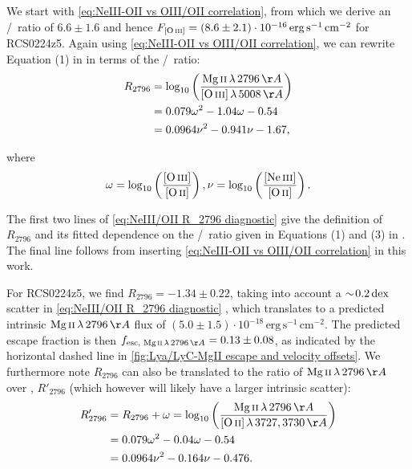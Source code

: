 We start with \cref{eq:NeIII-OII vs OIII/OII correlation}, from which we derive an \OIIIf/\OII\ ratio of $6.6 \pm 1.6$ and hence $F_\OIIIf = (8.6 \pm 2.1) \cdot 10^{-16} \, \mathrm{erg \, s^{-1} \, cm^{-2}}$ for RCS0224z5. Again using \cref{eq:NeIII-OII vs OIII/OII correlation}, we can rewrite Equation (1) in \citet{2018ApJ...855...96H} in terms of the \NeIII/\OII\ ratio:
\begin{align}
    \label{eq:NeIII/OII R_2796 diagnostic}
    R_{2796} & = \log_{10} \left( \frac{\MgII \, \lambda \, 2796 \, \Angstrom}{\OIIIf \, \lambda \, 5008 \, \Angstrom} \right) \nonumber
    \\
    & = 0.079 \omega^2 - 1.04 \omega - 0.54 \nonumber
    \\
    & = 0.0964 \nu^2 - 0.941 \nu - 1.67,
\end{align}

\noindent where
\begin{equation*}
    \omega = \log_{10} \left( \frac{\OIIIf}{\OII} \right), \nu = \log_{10} \left( \frac{\NeIII}{\OII} \right).
\end{equation*}

\noindent The first two lines of \cref{eq:NeIII/OII R_2796 diagnostic} give the definition of $R_{2796}$ and its fitted dependence on the \OIIIf/\OII\ ratio given in Equations (1) and (3) in \citet{2018ApJ...855...96H}. The final line follows from inserting \cref{eq:NeIII-OII vs OIII/OII correlation} in this work.

For RCS0224z5, we find $R_{2796} = -1.34 \pm 0.22$, taking into account a $\sim \! 0.2 \, \mathrm{dex}$ scatter in \cref{eq:NeIII/OII R_2796 diagnostic} \citep[see][]{2018ApJ...855...96H}, which translates to a predicted intrinsic $\MgII \, \lambda \, 2796 \, \Angstrom$ flux of $(5.0 \pm 1.5) \cdot 10^{-18} \, \mathrm{erg \, s^{-1} \, cm^{-2}}$. The predicted escape fraction is then $f_{\text{esc, }\MgII \, \lambda \, 2796 \, \Angstrom} = 0.13 \pm 0.08$, as indicated by the horizontal dashed line in \cref{fig:Lya/LyC-MgII escape and velocity offsets}. We furthermore note $R_{2796}$ can also be translated to the ratio of $\MgII \, \lambda \, 2796 \, \Angstrom$ over \OII, $R'_{2796}$ (which however will likely have a larger intrinsic scatter):
\begin{align}
    R'_{2796} & = R_{2796} + \omega = \log_{10} \left( \frac{\MgII \, \lambda \, 2796 \, \Angstrom}{\OII \, \lambda \, 3727, 3730 \, \Angstrom} \right) \nonumber
    \\
    & = 0.079 \omega^2 - 0.04 \omega - 0.54 \nonumber
    \\
    & = 0.0964 \nu^2 - 0.164 \nu - 0.476.
\end{align}


